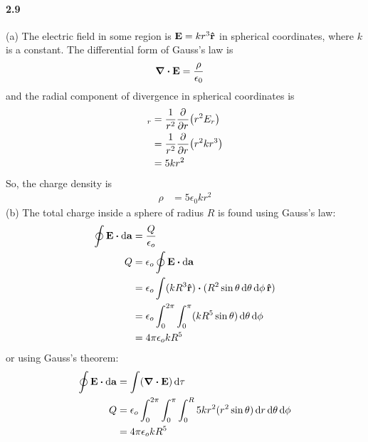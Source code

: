 \documentclass[../main.tex]{subfiles}
\begin{document}
\paragraph{2.9}
(a) The electric field in some region is $\vb{E} = kr^3 \vu{r}$ in spherical coordinates, where
$k$ is a constant. The differential form of Gauss's law is
\begin{align*}
    \div{\vb{E}} &= \frac{\rho}{\epsilon_0}
\end{align*}
and the radial component of divergence in spherical coordinates is
\begin{align*}
    [\div{\vb{E}}]_r &= \frac{1}{r^2} \pdv{r} (r^2 E_r) \\
    &= \frac{1}{r^2} \pdv{r} (r^2 kr^3) \\
    &= 5kr^2
\end{align*}
So, the charge density is
\begin{align*}
    \rho &= 5\epsilon_0 kr^2
\end{align*}
(b) The total charge inside a sphere of radius $R$ is found using Gauss's law:
\begin{align*}
\oint \vb{E} \vdot \dd{\vb{a}} &= \frac{Q}{\epsilon_o} \\
Q &= \epsilon_o \oint \vb{E} \vdot \dd{\vb{a}} \\
&= \epsilon_o \int (kR^3 \vu{r}) \vdot (R^2 \sin\theta \dd{\theta} \dd{\phi} \vu{r}) \\
&= \epsilon_o \int_0^{2\pi} \int_0^\pi (kR^5 \sin\theta) \dd{\theta} \dd{\phi} \\
&= 4\pi \epsilon_o k R^5
\end{align*}
or using Gauss's theorem:
\begin{align*}
    \oint \vb{E} \vdot \dd{\vb{a}} &= \int (\div \vb{E}) \dd{\tau} \\
    Q &= \epsilon_o \int_0^{2\pi} \int_0^\pi \int_0^R
        5kr^2 (r^2 \sin\theta) \dd{r} \dd{\theta} \dd{\phi} \\
    &= 4\pi \epsilon_o k R^5
\end{align*}
\end{document}
